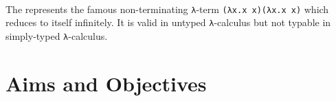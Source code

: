 \begin{code}%
\>[0]\AgdaSymbol{\{-\#}\AgdaSpace{}%
\AgdaSpace{}%
\AgdaSymbol{\#-\}}\<%
\\
\>[0]\AgdaSpace{}%
\AgdaSpace{}%
\AgdaSymbol{:}\AgdaSpace{}%
\AgdaSpace{}%
\<%
\\
\>[0][@{}l@{\AgdaIndent{0}}]%
\>[2]\AgdaSpace{}%
\AgdaSymbol{:}\AgdaSpace{}%
\AgdaSymbol{(}\AgdaSpace{}%
\AgdaSpace{}%
\AgdaSymbol{)}\AgdaSpace{}%
\AgdaSpace{}%
\<%
\\
%
\\[\AgdaEmptyExtraSkip]%
\>[0]\AgdaSpace{}%
\AgdaSymbol{:}\AgdaSpace{}%
\AgdaSpace{}%
\AgdaSpace{}%
\AgdaSpace{}%
\AgdaSpace{}%
\<%
\\
\>[0]\AgdaSpace{}%
\AgdaSymbol{(}\AgdaSpace{}%
\AgdaSymbol{)}\AgdaSpace{}%
\AgdaSpace{}%
\AgdaSymbol{=}\AgdaSpace{}%
\AgdaSpace{}%
\<%
\\
%
\\[\AgdaEmptyExtraSkip]%
\>[0]\AgdaSpace{}%
\AgdaSymbol{:}\AgdaSpace{}%
\<%
\\
\>[0]\AgdaSpace{}%
\AgdaSymbol{=}\AgdaSpace{}%
\AgdaSpace{}%
\AgdaSpace{}%
\AgdaSpace{}%
\AgdaSpace{}%
\AgdaSpace{}%
\AgdaSpace{}%
\AgdaSymbol{)}\<%
\\
%
\\[\AgdaEmptyExtraSkip]%
\>[0]\AgdaSpace{}%
\AgdaSymbol{:}\AgdaSpace{}%
\<%
\\
\>[0]\AgdaSpace{}%
\AgdaSymbol{=}\AgdaSpace{}%
\AgdaSpace{}%
\AgdaSpace{}%
\<%
\end{code}

The  represents the famous non-terminating \texttt{λ}-term \texttt{(λx.x x)(λx.x x)} which reduces to itself infinitely. It is valid in untyped \texttt{λ}-calculus but not typable in simply-typed \texttt{λ}-calculus. 

\section{Aims and Objectives}

